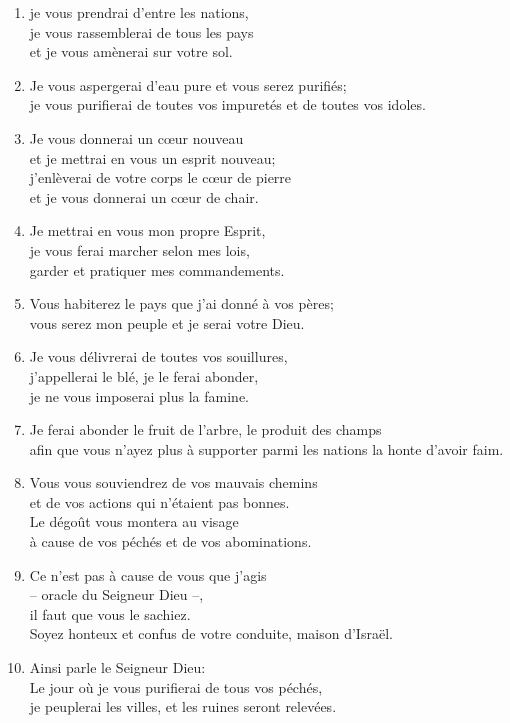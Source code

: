 \begin{enumerate}[leftmargin=\psleftmargin, labelsep = \pslabelsep, label={\arabic*}, font=\color{\pscolor}\small\textsuperscript, parsep=0em, itemsep=0em, topsep=0em ]
    \item je vous prendrai d’entre les nations, \\ je vous rassemblerai de tous les pays \\ et je vous amènerai sur votre sol.
    \item Je vous aspergerai d’eau pure et vous serez purifiés; \\ je vous purifierai de toutes vos impuretés et de toutes vos idoles.
    \newpage
    \item Je vous donnerai un cœur nouveau \\ et je mettrai en vous un esprit nouveau; \\ j’enlèverai de votre corps le cœur de pierre \\ et je vous donnerai un cœur de chair.
    \item Je mettrai en vous mon propre Esprit, \\ je vous ferai marcher selon mes lois, \\ garder et pratiquer mes commandements.
    \item Vous habiterez le pays que j’ai donné à vos pères; \\ vous serez mon peuple et je serai votre Dieu.
    \item Je vous délivrerai de toutes vos souillures, \\ j’appellerai le blé, je le ferai abonder, \\ je ne vous imposerai plus la famine.
    \item Je ferai abonder le fruit de l’arbre, le produit des champs \\ afin que vous n’ayez plus à supporter parmi les nations la honte d’avoir faim.
    \item Vous vous souviendrez de vos mauvais chemins \\ et de vos actions qui n’étaient pas bonnes. \\ Le dégoût vous montera au visage \\ à cause de vos péchés et de vos abominations.
    \item Ce n’est pas à cause de vous que j’agis \\ – oracle du Seigneur Dieu –, \\ il faut que vous le sachiez. \\ Soyez honteux et confus de votre conduite, maison d’Israël. \parSpace
    \item Ainsi parle le Seigneur Dieu: \\ Le jour où je vous purifierai de tous vos péchés, \\ je peuplerai les villes, et les ruines seront relevées.

\end{enumerate}
